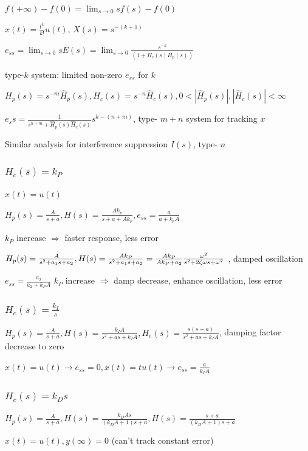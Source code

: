 $f(+\infty) - f(0) = \lim_{s\to 0} sf(s) - f(0)$

$x(t) = \frac{t^k}{k!} u(t)$, $X(s) = s^{-(k+1)}$

$e_{ss} = \lim_{s\to 0} s E(s) = \lim_{s\to 0} \frac{s^{-k}}{(1 + H_c(s) H_p(s))}$

type-$k$ system: limited non-zero $e_{ss}$ for $k$


$H_p(s) = s^{-m} \hat H_p(s), H_c(s) = s^{-n} \hat H_c(s), 0< |\hat H_p(s)|, |\hat H_c(s)| < \infty $

$e_ss = \frac{1}{s^{n+m} + \hat H_p(s)\hat H_c(s)} s^{k-(n+m)}$, type- $m+n$ system for tracking $x$

Similar analysis for interference suppression $I(s)$, type- $n$

\subsubsection*{$H_c(s) = k_P$}

$x(t) = u(t)$

$H_p(s) = \frac{A}{s+a}, H(s) = \frac{Ak_p}{s+a+Ak_p}, e_{ss}= \frac{a}{a+k_pA}$

$k_P$ increase $\Rightarrow$ faster response, less error

$H_p(s) = \frac{A}{s^2+a_1s+a_2}, H(s) = \frac{Ak_P}{s^2+a_1s+a_2} = \frac{Ak_P}{Ak_P + a_2} \frac{\omega^2}{s^2+2\zeta\omega s + \omega^2}$ , damped oscillation

$e_{ss} = \frac{a_2}{a_2 + k_PA}$
$k_P$ increase $\Rightarrow$ damp decrease, enhance oscillation, less error

\subsubsection*{$H_c(s) =\frac{k_I}{s}$}

$H_p(s) = \frac{A}{s+a}, H(s)=\frac{k_IA}{s^2+as+k_IA}, H_e(s) =\frac{s(s+a)}{s^2+as+k_IA}$, damping factor decrease to zero

$x(t)=u(t)\rightarrow e_{ss} = 0, x(t) = tu(t)\rightarrow e_{ss} = \frac{a}{k_IA}$

\subsubsection*{$H_c(s) = k_Ds$}

$H_p(s)=\frac{A}{s+a}, H(s)=\frac{k_DAs}{(k_DA+1)s+a}, H(s)=\frac{s+a}{(k_DA+1)s+a}$

$x(t)=u(t), y(\infty)=0$ (can't track constant error)

